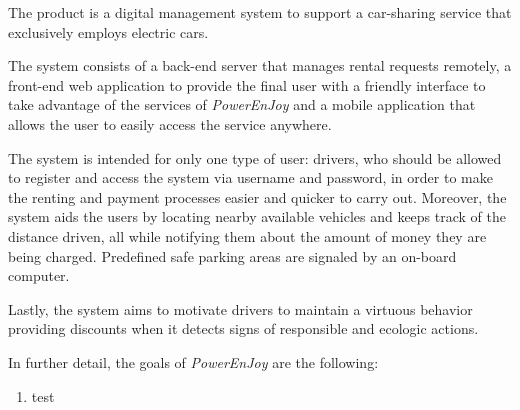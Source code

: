 The product is a digital management system to support a car-sharing service that exclusively employs electric cars.

The system consists of a back-end server that manages rental requests remotely, a front-end web application to provide the final user with a friendly interface to take advantage of the services of \hbox{\emph{PowerEnJoy}} and a mobile application that allows the user to easily access the service anywhere.

The system is intended for only one type of user: drivers, who should be allowed to register and access the system via username and password, in order to make the renting and payment processes easier and quicker to carry out. Moreover, the system aids the users by locating nearby available vehicles and keeps track of the distance driven, all while notifying them about the amount of money they are being charged. Predefined safe parking areas are signaled by an on-board computer.

Lastly, the system aims to motivate drivers to maintain a virtuous behavior providing discounts when it detects signs of responsible and ecologic actions.

In further detail, the goals of \hbox{\emph{PowerEnJoy}} are the following:

\begin{enumerate}
\item test
\end{enumerate}